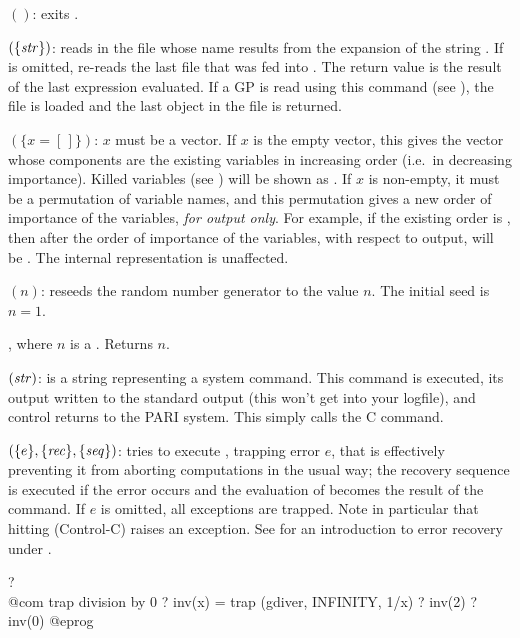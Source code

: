 $()$: exits .\label{se:quit}

$(\{\hbox{\it str\/}\})$: reads in the file whose name results
from the expansion of the string . If  is omitted,
re-reads the last file that was fed into . The return value is the result of
the last expression evaluated.\label{se:read} If a GP  is
read using this command (see ), the file is loaded and
the last object in the file is returned.

$(\{x=[\,]\})$: $x$ must be a vector. If $x$ is the
empty vector, this gives the vector whose components are the existing
variables in increasing order (i.e.~in decreasing importance). Killed
variables (see ) will be shown as . If $x$ is
non-empty, it must be a permutation of variable names, and this permutation
gives a new order of importance of the variables, \emph{for output only}. For
example, if the existing order is \kbd{[x,y,z]}, then after
 the order of importance of the variables, with respect
to output, will be \kbd{[z,y,x]}. The internal representation is unaffected.
\label{se:reorder}

$(n)$: reseeds the random number generator to the value
$n$. The initial seed is $n=1$.

, where $n$ is a . Returns $n$.

$(\hbox{\it str\/})$:  is a string representing
a system command. This command is executed, its output written to the
standard output (this won't get into your logfile), and control returns
to the PARI system. This simply calls the C  command.

$(\{e\}, \{\hbox{\it rec\/}\}, \{\hbox{\it seq\/}\})$: tries to
execute , trapping error $e$, that is effectively preventing it
from aborting computations in the usual way; the recovery sequence
 is executed if the error occurs and the evaluation of 
becomes the result of the command. If $e$ is omitted, all exceptions are
trapped. Note in particular that hitting  (Control-C) raises an
exception. See  for an introduction to error recovery
under .

\bprog
? \\@com trap division by 0
? inv(x) = trap (gdiver, INFINITY, 1/x)
? inv(2)
? inv(0)
@eprog

